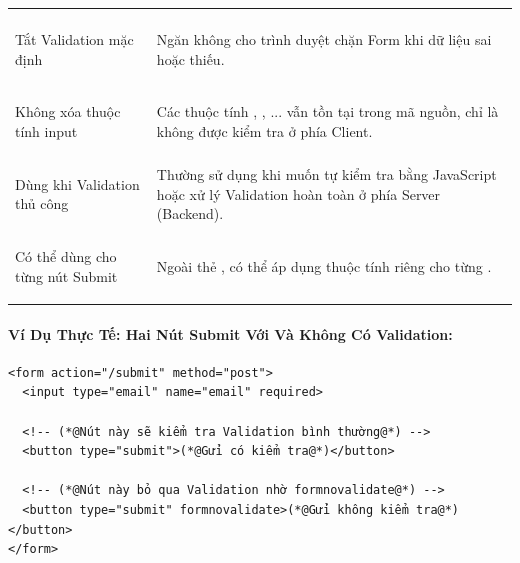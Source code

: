 \begin{prettyTableBox}
\sffamily\small
\begin{tabularx}{\linewidth}{>{\sffamily\bfseries\color{primaryBlue}\raggedright\arraybackslash}m{4.0cm} Z}
 &  \\

Tắt Validation mặc định & Ngăn không cho trình duyệt chặn Form khi dữ liệu sai hoặc thiếu. \\

Không xóa thuộc tính input & Các thuộc tính , , ... vẫn tồn tại trong mã nguồn, chỉ là không được kiểm tra ở phía Client. \\

Dùng khi Validation thủ công & Thường sử dụng khi muốn tự kiểm tra bằng JavaScript hoặc xử lý Validation hoàn toàn ở phía Server (Backend). \\

Có thể dùng cho từng nút Submit & Ngoài thẻ , có thể áp dụng thuộc tính  riêng cho từng . \\
\end{tabularx}
\end{prettyTableBox}

\paragraph{Ví Dụ Thực Tế: Hai Nút Submit Với Và Không Có Validation:}

\begin{codeWindow}
\begin{lstlisting}[language=HTML5]
<form action="/submit" method="post">
  <input type="email" name="email" required>

  <!-- (*@Nút này sẽ kiểm tra Validation bình thường@*) -->
  <button type="submit">(*@Gửi có kiểm tra@*)</button>

  <!-- (*@Nút này bỏ qua Validation nhờ formnovalidate@*) -->
  <button type="submit" formnovalidate>(*@Gửi không kiểm tra@*)</button>
</form>
\end{lstlisting}
\end{codeWindow}

